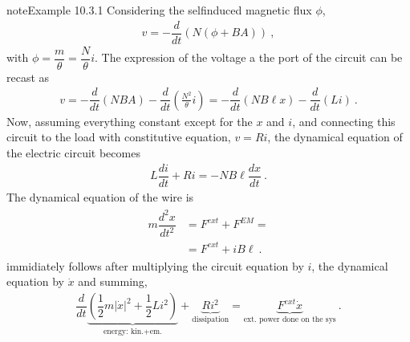 \documentclass[letterpaper,10pt,italian]{jupyterBook}
\begin{document}
\begin{sphinxadmonition}{note}{Example 10.3.1}
\sphinxAtStartPar
{} Considering the self\sphinxhyphen{}induced magnetic flux \(\phi\),
\begin{equation*}
\begin{split}v = - \dfrac{d}{dt} \left( N \left( \phi + B A \right) \right) \ ,\end{split}
\end{equation*}
\sphinxAtStartPar
with \(\phi = \dfrac{m}{\theta} = \dfrac{N}{\theta} i\). The expression of the voltage a the port of the circuit can be recast as
\begin{equation*}
\begin{split}v = - \dfrac{d}{dt} \left( N B A \right) - \dfrac{d}{dt} \left( \frac{N^2}{\theta} i \right) = - \dfrac{d}{dt} \left( N B \ell x \right) - \dfrac{d}{dt} \left( L i \right) \ .\end{split}
\end{equation*}
\sphinxAtStartPar
Now, assuming everything constant except for the \(x\) and \(i\), and connecting this circuit to the load with constitutive equation, \(v = R i\), the dynamical equation of the electric circuit becomes
\begin{equation*}
\begin{split}L \dfrac{d i}{d t} + R i = - N B \ell \dfrac{d x}{d t} \ .\end{split}
\end{equation*}
\sphinxAtStartPar
The dynamical equation of the wire is
\begin{equation*}
\begin{split}\begin{aligned}
 m \dfrac{d^2 x}{d t^2} 
 & = F^{ext} + F^{EM} = \\
 & = F^{ext} + i B \ell \ .
\end{aligned}\end{split}
\end{equation*}
\sphinxAtStartPar
{} immidiately follows after multiplying the circuit equation by \(i\), the dynamical equation by \(\dot{x}\) and summing,
\begin{equation*}
\begin{split}\dfrac{d}{dt} \underbrace{\left( \dfrac{1}{2} m |\dot{x}|^2 + \dfrac{1}{2} L i^2 \right)}_{\text{energy: kin.+em.}} + \underbrace{R i^2}_{\text{dissipation}} = \underbrace{F^{ext} \dot{x}}_{\text{ext. power done on the sys}} \ .\end{split}
\end{equation*}\end{sphinxadmonition}
\end{document}

